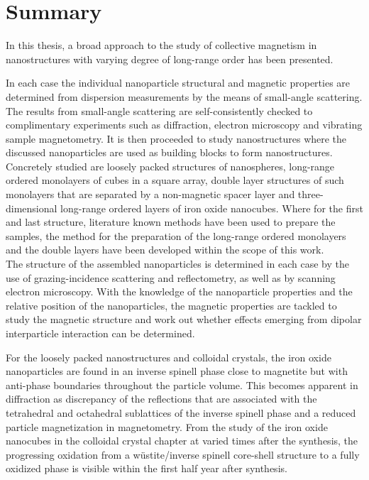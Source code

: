 \documentclass[\main/dresen_thesis.tex]{subfiles}
\begin{document}
\chapter{Summary}\label{ch:summary}
  In this thesis, a broad approach to the study of collective magnetism in nanostructures with varying degree of long-range order has been presented.

  In each case the individual nanoparticle structural and magnetic properties are determined from dispersion measurements by the means of small-angle scattering.
  The results from small-angle scattering are self-consistently checked to complimentary experiments such as diffraction, electron microscopy and vibrating sample magnetometry.
  It is then proceeded to study nanostructures where the discussed nanoparticles are used as building blocks to form nanostructures.
  Concretely studied are loosely packed structures of nanospheres, long-range ordered monolayers of cubes in a square array, double layer structures of such monolayers that are separated by a non-magnetic spacer layer and three-dimensional long-range ordered layers of iron oxide nanocubes.
  Where for the first and last structure, literature known methods have been used to prepare the samples, the method for the preparation of the long-range ordered monolayers and the double layers have been developed within the scope of this work.
  \\

  The structure of the assembled nanoparticles is determined in each case by the use of grazing-incidence scattering and reflectometry, as well as by scanning electron microscopy.
  With the knowledge of the nanoparticle properties and the relative position of the nanoparticles, the magnetic properties are tackled to study the magnetic structure and work out whether effects emerging from dipolar interparticle interaction can be determined.

  For the loosely packed nanostructures and colloidal crystals, the iron oxide nanoparticles are found in an inverse spinell phase close to magnetite but with anti-phase boundaries throughout the particle volume.
  This becomes apparent in diffraction as discrepancy of the reflections that are associated with the tetrahedral and octahedral sublattices of the inverse spinell phase and a reduced particle magnetization in magnetometry.
  From the study of the iron oxide nanocubes in the colloidal crystal chapter at varied times after the synthesis, the progressing oxidation from a w\"ustite/inverse spinell core-shell structure to a fully oxidized phase is visible within the first half year after synthesis.
\end{document}
